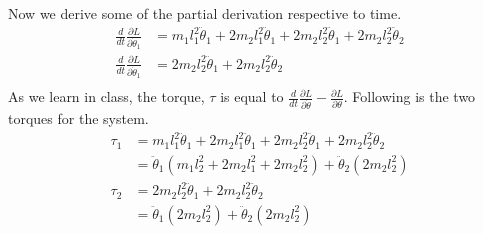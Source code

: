 Now we derive some of the partial derivation respective to time.
\begin{equation}
\begin{aligned}
\frac{d}{dt}\frac{\partial L}{\partial \dot{\theta}_1} &= m_1l_1^2\ddot{\theta}_1 + 2 m_2 l_1^2 \ddot{\theta}_1 + 2 m_2 l_2^2 \ddot{\theta}_1 + 2 m_2 l_2^2 \ddot{\theta}_2\\
\frac{d}{dt} \frac{\partial L}{\partial \dot{\theta}_1} &= 2m_2l_2^2 \ddot{\theta}_1 + 2m_2 l_2^2\ddot{\theta}_2\\
\end{aligned}
\end{equation}
As we learn in class, the torque, $\tau$ is equal to $\frac{d}{dt} \frac{\partial L}{\partial \dot{\theta}} - \frac{\partial L}{\partial \theta}$. Following is the two torques for the system.
\begin{equation}
\begin{aligned}
\tau_1 &= m_1l_1^2\ddot{\theta}_1 + 2 m_2 l_1^2 \ddot{\theta}_1 + 2 m_2 l_2^2 \ddot{\theta}_1 + 2 m_2 l_2^2 \ddot{\theta}_2\\
&= \ddot{\theta}_1(m_1l_2^2 + 2 m_2 l_1^2 + 2 m_2 l_2^2) + \ddot{\theta}_2(2 m_2 l_2^2)\\
\tau_2 &= 2m_2l_2^2 \ddot{\theta}_1 + 2m_2 l_2^2\ddot{\theta}_2\\
&= \ddot{\theta}_1(2m_2l_2^2) + \ddot{\theta}_2(2m_2 l_2^2)
\end{aligned}
\end{equation}

